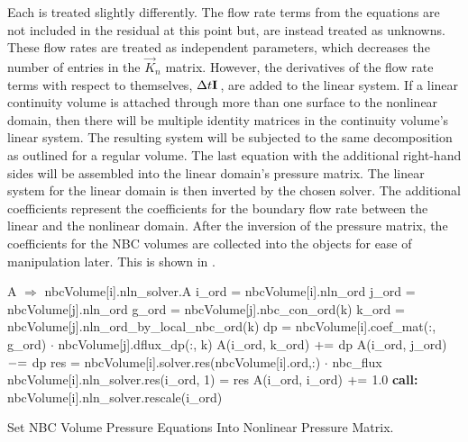Each  is treated slightly differently.
The flow rate terms from the equations are not included in the residual at this point but, are instead treated as unknowns.
These flow rates are treated as independent parameters, which decreases the number of entries in the $\vec{K}_{n}$ matrix.
However, the derivatives of the flow rate terms with respect to themselves, $\dt{} \vec{I}$, are added to the linear system.
If a linear continuity volume is attached through more than one surface to the nonlinear domain, then there will be multiple identity matrices in the continuity volume's linear system.
The resulting system will be subjected to the same  decomposition as outlined for a regular volume.
The last equation with the additional right-hand sides will be assembled into the linear domain's pressure matrix.
The linear system for the linear domain is then inverted by the chosen solver.
The additional coefficients represent the coefficients for the boundary flow rate between the linear and the nonlinear domain.
After the inversion of the pressure matrix, the coefficients for the NBC volumes are collected into the  objects for ease of manipulation later.
This is shown in .

\begin{algo}[ht!]
\setlength{\baselineskip}{0.625\baselineskip}
\begin{algorithmic}[1]
	\Set A $\Rightarrow$ nbcVolume[i].nln\_solver.A
	\Set i\_ord = nbcVolume[i].nln\_ord
		\Set j\_ord = nbcVolume[j].nln\_ord
			\Set g\_ord = nbcVolume[j].nbc\_con\_ord(k)
			\Set k\_ord = nbcVolume[j].nln\_ord\_by\_local\_nbc\_ord(k)
			\Set dp = nbcVolume[i].coef\_mat(:, g\_ord) $\cdot$ nbcVolume[j].dflux\_dp(:, k)
			\Set A(i\_ord, k\_ord) $\mathrel{+}=$ dp
			\Set A(i\_ord, j\_ord) $\mathrel{-}=$ dp
		\EndFor
	\EndFor
	\Set res = nbcVolume[i].solver.res(nbcVolume[i].ord,:) $\cdot$ nbc\_flux
	\Set nbcVolume[i].nln\_solver.res(i\_ord, 1) = res
	\Set A(i\_ord, i\_ord) $\mathrel{+}=$ 1.0
	\State \textbf{call:} nbcVolume[i].nln\_solver.rescale(i\_ord)
\EndFor
\end{algorithmic}
\caption{Set NBC Volume Pressure Equations Into Nonlinear Pressure Matrix.}
\label{alg:domDecompSetMat}
\end{algo}

